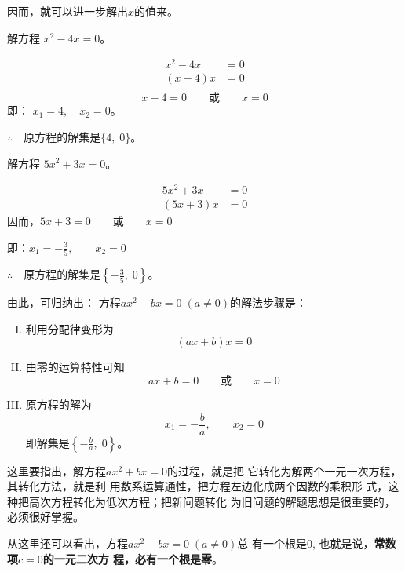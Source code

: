 因而，就可以进一步解出$x$的值来。

\begin{example}
    解方程 $x^2-4x=0$。    
\end{example}

\begin{solution}
    \begin{align*}
        x^2-4x&=0\\
        (x-4)x&=0\tag{分配律}\\
    \end{align*}
\[x-4=0\qquad \text{或}\qquad x=0\]
即： $x_1=4,\quad x_2=0$。

$\therefore\quad $原方程的解集是$\{4,\; 0\}$。
\end{solution}



\begin{example}
    解方程
$5x^2+3x=0$。
\end{example}

\begin{solution}
\begin{align*}
    5x^2+3x&=0\\
    (5x+3)x&=0
\end{align*}  
因而，$5x+3=0\qquad \text{或}\qquad x=0$

即：$x_1=-\frac{3}{5},\qquad x_2=0$

$\therefore\quad $原方程的解集是$\left\{-\frac{3}{5},\; 0\right\}$。
\end{solution}

由此，可归纳出：
方程$ax^2+bx=0\; (a\ne 0)$的解法步骤是：

\begin{blk}{}
\begin{enumerate}[I. ]
    \item 利用分配律变形为
    $$(ax+b)x=0$$
    \item 由零的运算特性可知
    $$ax+b=0\qquad  \text{或}\qquad x=0$$
    \item 原方程的解为
    $$x_1=-\frac{b}{a},\qquad x_2=0$$
    即解集是$\left\{-\frac{b}{a},\; 0\right\}$。
\end{enumerate}
\end{blk}

这里要指出，解方程$ax^2+bx=0$的过程，就是把
它转化为解两个一元一次方程，其转化方法，就是利
用数系运算通性，把方程左边化成两个因数的乘积形
式，这种把高次方程转化为低次方程；把新问题转化
为旧问题的解题思想是很重要的，必须很好掌握。

从这里还可以看出，方程$ax^2+bx=0\; (a\ne 0)$总
有一个根是0, 也就是说，\textbf{常数项$c=0$的一元二次方
程，必有一个根是零}。

